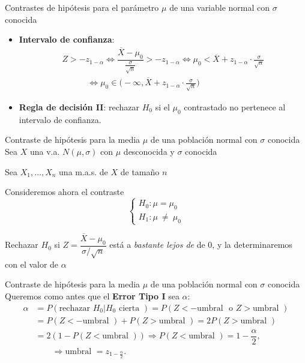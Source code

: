\documentclass[
  ignorenonframetext,
]{beamer}
\begin{document}
\begin{frame}{Contrastes de hipótesis para el parámetro \(\mu\) de una
variable normal con \(\sigma\) conocida}
\protect\hypertarget{contrastes-de-hipuxf3tesis-para-el-paruxe1metro-mu-de-una-variable-normal-con-sigma-conocida-11}{}
\begin{itemize}[<+->]
\item
  \textbf{Intervalo de confianza}: \[
  \begin{array}{l}
  Z> -z_{1-\alpha}\Longleftrightarrow \dfrac{\overline{X}-\mu_0}{\frac{\sigma}{\sqrt{n}}}> -z_{1-\alpha} 
  \Longleftrightarrow \mu_0< \overline{X}+z_{1-\alpha}\cdot\frac{\sigma}{\sqrt{n}}\\
  \qquad\quad\Longleftrightarrow \mu_0\in {\Big(-\infty,\overline{X}+z_{1-\alpha}\cdot\frac{\sigma}{\sqrt{n}}\Big)}
  \end{array}
  \]
\item
  \textbf{Regla de decisión II}: rechazar \(H_0\) si el \(\mu_0\)
  contrastado no pertenece al intervalo de confianza.
\end{itemize}
\end{frame}

\begin{frame}{Contraste de hipótesis para la media \(\mu\) de una
población normal con \(\sigma\) conocida}
\protect\hypertarget{contraste-de-hipuxf3tesis-para-la-media-mu-de-una-poblaciuxf3n-normal-con-sigma-conocida}{}
Sea \(X\) una v.a. \(N(\mu,\sigma)\) con \(\mu\) desconocida y
\(\sigma\) conocida

Sea \(X_1,\ldots,X_{n}\) una m.a.s. de \(X\) de tamaño \(n\)

Consideremos ahora el contraste \[
\left\{\begin{array}{l}
H_0:\mu=\mu_0\\ H_1:\mu\ \neq\ \mu_0
\end{array}
\right.
\]

Rechazar \(H_0\) si
\(Z=\dfrac{\overline{X}-\mu_0}{{\sigma}/{\sqrt{n}}}\) está a
\emph{bastante lejos de} de 0, y la determinaremos con el valor de
\(\alpha\)
\end{frame}

\begin{frame}{Contraste de hipótesis para la media \(\mu\) de una
población normal con \(\sigma\) conocida}
\protect\hypertarget{contraste-de-hipuxf3tesis-para-la-media-mu-de-una-poblaciuxf3n-normal-con-sigma-conocida-1}{}
Queremos como antes que el \textbf{Error Tipo I} sea \(\alpha\): \[
\begin{array}{rl}
\alpha & =P(\mbox{rechazar } H_0| H_0 \mbox{ cierta })
 =P(Z<-\mbox{umbral }\mbox{ o }Z>\mbox{umbral })\\
& =P(Z<-\mbox{umbral })\!+\!P(Z>\mbox{umbral })
 = 2P(Z>\mbox{umbral }) \\ &= 2(1-P(Z<\mbox{umbral }))
 \Longrightarrow P(Z<\mbox{umbral })=1-\dfrac{\alpha}2,\\
& \qquad \Longrightarrow \mbox{umbral }=z_{1-\frac{\alpha}2}.
\end{array}
\]
\end{frame}
\end{document}
